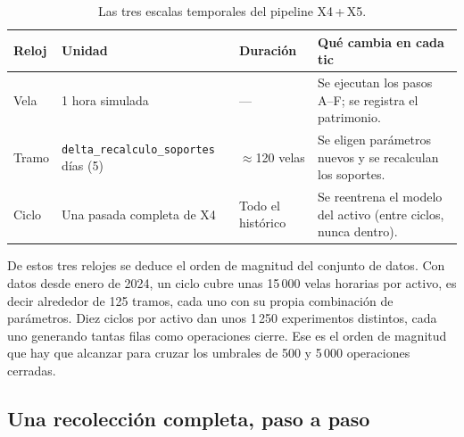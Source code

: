 \documentclass[11pt,a4paper]{article}
\newcommand{\code}[1]{\texttt{\small #1}}
\newcommand{\bigsep}{\par\vspace{3pt}}
\begin{document}
\begin{table}[h]
\centering
\small
\begin{tabularx}{\linewidth}{@{}l l l X@{}}
\toprule
\textbf{Reloj} & \textbf{Unidad} & \textbf{Duración} & \textbf{Qué cambia en cada tic} \\
\midrule
Vela & 1 hora simulada & --- & Se ejecutan los pasos A--F; se registra el patrimonio. \\
Tramo & \code{delta_recalculo_soportes} días (5) & $\approx$120 velas & Se eligen parámetros nuevos y se recalculan los soportes. \\
Ciclo & Una pasada completa de X4 & Todo el histórico & Se reentrena el modelo del activo (entre ciclos, nunca dentro). \\
\bottomrule
\end{tabularx}
\caption{Las tres escalas temporales del pipeline X4\,+\,X5.}
\end{table}

\bigsep
De estos tres relojes se deduce el orden de magnitud del conjunto de datos. Con datos desde
enero de 2024, un ciclo cubre unas 15\,000 velas horarias por activo, es decir alrededor de
125 tramos, cada uno con su propia combinación de parámetros. Diez ciclos por activo dan
unos 1\,250 experimentos distintos, cada uno generando tantas filas como operaciones cierre.
Ese es el orden de magnitud que hay que alcanzar para cruzar los umbrales de 500 y 5\,000
operaciones cerradas.

\subsection{Una recolección completa, paso a paso}
\end{document}
